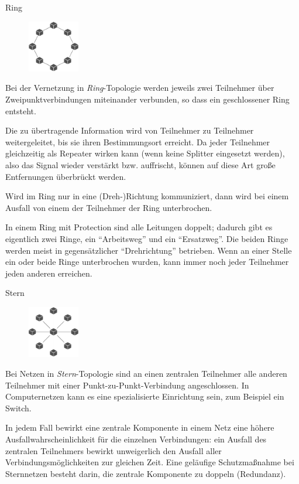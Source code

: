 \begin{defi}{Ring}
    \begin{figure}
        \centering
        \includegraphics[width=0.2\textwidth]{includes/figures/defi_ring.pdf}
    \end{figure}%
    Bei der Vernetzung in \emph{Ring}-Topologie werden jeweils zwei Teilnehmer über Zweipunktverbindungen miteinander verbunden, so dass ein geschlossener Ring entsteht.

    Die zu übertragende Information wird von Teilnehmer zu Teilnehmer weitergeleitet, bis sie ihren Bestimmungsort erreicht.
    Da jeder Teilnehmer gleichzeitig als Repeater wirken kann (wenn keine Splitter eingesetzt werden), also das Signal wieder verstärkt bzw. auffrischt, können auf diese Art große Entfernungen überbrückt werden.

    Wird im Ring nur in eine (Dreh-)Richtung kommuniziert, dann wird bei einem Ausfall von einem der Teilnehmer der Ring unterbrochen.

    In einem Ring mit Protection sind alle Leitungen doppelt; dadurch gibt es eigentlich zwei Ringe, ein \enquote{Arbeitsweg} und ein \enquote{Ersatzweg}.
    Die beiden Ringe werden meist in gegensätzlicher \enquote{Drehrichtung} betrieben.
    Wenn an einer Stelle ein oder beide Ringe unterbrochen wurden, kann immer noch jeder Teilnehmer jeden anderen erreichen.
\end{defi}

\begin{defi}{Stern}
    \begin{figure}
        \centering
        \includegraphics[width=0.2\textwidth]{includes/figures/defi_stern.pdf}
    \end{figure}%
    Bei Netzen in \emph{Stern}-Topologie sind an einen zentralen Teilnehmer alle anderen Teilnehmer mit einer Punkt-zu-Punkt-Verbindung angeschlossen.
    In Computernetzen kann es eine spezialisierte Einrichtung sein, zum Beispiel ein Switch.

    In jedem Fall bewirkt eine zentrale Komponente in einem Netz eine höhere Ausfallwahrscheinlichkeit für die einzelnen Verbindungen:
    ein Ausfall des zentralen Teilnehmers bewirkt unweigerlich den Ausfall aller Verbindungsmöglichkeiten zur gleichen Zeit.
    Eine geläufige Schutzmaßnahme bei Sternnetzen besteht darin, die zentrale Komponente zu doppeln (Redundanz).
\end{defi}

